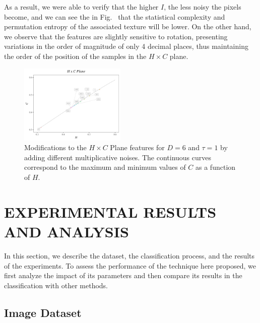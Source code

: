 \documentclass[journal]{IEEEtran}
\begin{document}
    As a result, we were able to verify that the higher $I$, the less noisy the pixels become, and we can see the in Fig.~ that the statistical complexity and permutation entropy of the associated texture will be lower.
    On the other hand, we observe that the features are slightly sensitive to rotation, presenting variations in the order of magnitude of only 4 decimal places, thus maintaining the order of the position of the samples in the $H \times C$ plane.
    
	\begin{figure}[hbt]
		\includegraphics[width=0.45\textwidth]{Figures/waves1.pdf}
		\caption{Modifications to the $H \times C$ Plane features for $D = 6$ and $\tau = 1$ by adding different multiplicative noises.
        The continuous curves correspond to the maximum and minimum values of $C$ as a function of $H$.}
		\label{fig:speckleHC}
	\end{figure}

	\section{EXPERIMENTAL RESULTS AND ANALYSIS}\label{Results}
	
	In this section, we describe the dataset, 
	the classification process, and 
	the results of the experiments.
	To assess the performance of the technique here proposed, we first analyze the impact of its parameters and then compare its results in the classification with other methods.
	
	\subsection{Image Dataset}
	
\end{document}
